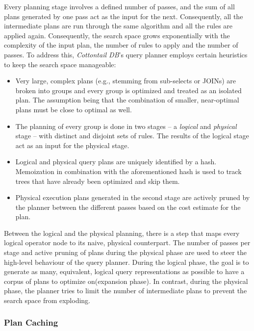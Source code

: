 Every planning stage involves a defined number of passes, and the sum of all plans generated by one pass act as the input for the next. Consequently, all the intermediate plans are run through the same algorithm and all the rules are applied again. Consequently, the search space grows exponentially with the complexity of the input plan, the number of rules to apply and the number of passes. To address this, \emph{Cottontail DB}'s query planner employs certain heuristics to keep the search space manageable:

\begin{itemize}
    \item Very large, complex plans (e.g., stemming from sub-selects or JOINs) are broken into groups and every group is optimized and treated as an isolated plan. The assumption being that the combination of smaller, near-optimal plans must be close to optimal as well.
    \item The planning of every group is done in two stages -- a \emph{logical} and \emph{physical} stage -- with distinct and disjoint sets of rules. The results of the logical stage act as an input for the physical stage.
    \item Logical and physical query plans are uniquely identified by a hash. Memoization in combination with the aforementioned hash is used to track trees that have already been optimized and skip them.
    \item Physical execution plans generated in the second stage are actively pruned by the planner between the different passes based on the cost estimate for the plan.
\end{itemize}

Between the logical and the physical planning, there is a step that maps every logical operator node to its naive, physical counterpart. The number of passes per stage and active pruning of plans during the physical phase are used to steer the high-level behaviour of the query planner. During the logical phase, the goal is to generate as many, equivalent, logical query representations as possible to have a corpus of plans to optimize on(expansion phase). In contrast, during the physical phase, the planner tries to limit the number of intermediate plans to prevent the search space from exploding.

\subsubsection{Plan Caching}

